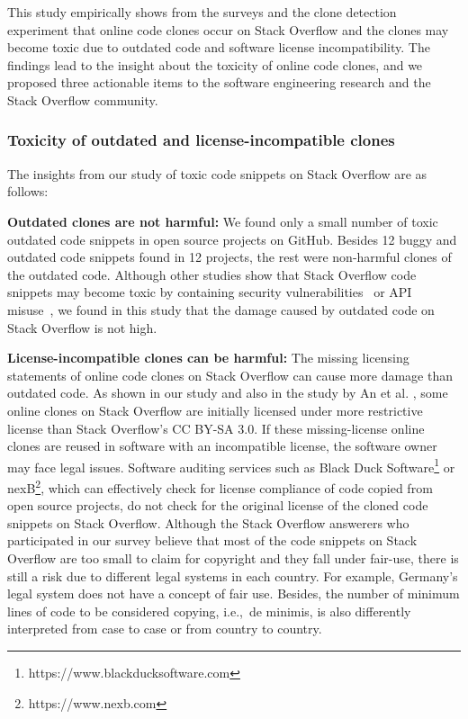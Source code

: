 \documentclass[10pt,journal,compsoc]{IEEEtran}
\begin{document}

This study empirically shows from the surveys and the clone detection experiment that
online code clones occur on Stack Overflow and the clones may become toxic due
to outdated code and software license incompatibility. The findings lead to the
insight about the toxicity of online code clones, and we proposed three actionable items
to the software engineering research and the Stack Overflow community.

\subsubsection{Toxicity of outdated and license-incompatible clones}
The insights from our study of toxic code snippets on Stack Overflow are as follows:

\textbf{Outdated clones are not harmful:} We found only a small number of toxic outdated code snippets in open source projects on
GitHub. Besides 12 buggy and outdated code snippets found in 12 projects, the
rest were non-harmful clones of the outdated code. Although other studies show
that Stack Overflow code snippets may become toxic by containing security
vulnerabilities~\cite{Acar2016,Fischer2017} or API misuse~\cite{Zhang2018}, we
found in this study that the damage caused by outdated code on Stack
Overflow is not high.

\textbf{License-incompatible clones can be harmful:} The missing licensing statements of online code clones on
Stack Overflow can cause more damage than outdated code. As shown in our study and
also in the study by An et al. \cite{An2017}, some online clones on Stack Overflow are
initially licensed under more restrictive license than Stack Overflow's CC
BY-SA 3.0. If these missing-license online clones are reused in software with
an incompatible license, the software owner may face legal issues. Software
auditing services such as Black Duck Software\footnote{https://www.blackducksoftware.com} 
or nexB\footnote{https://www.nexb.com}, which can effectively
check for license compliance of code copied from open source projects, do not
check for the original license of the cloned code snippets on Stack Overflow. Although
the Stack Overflow answerers who participated in our survey believe that most of the
code snippets on Stack Overflow are too small to claim for copyright and they
fall under fair-use, there is still a risk due to different legal systems in each
country. For example, Germany's legal system does not have a concept of fair use.
Besides, the number of minimum lines of code to be considered copying, i.e.,~de minimis,
is also differently interpreted from case to case or from country to country.
\end{document}
